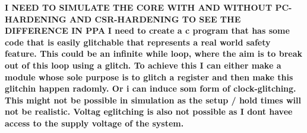 \textbf{I NEED TO SIMULATE THE CORE WITH AND WITHOUT PC-HARDENING AND CSR-HARDENING TO SEE THE DIFFERENCE IN PPA}
\textbf{I need to create a c program that has some code that is easily glitchable that represents a real world safety feature. This could be an infinite while loop, where the aim is to break out of this loop using a glitch. To achieve this I can either make a module whose sole purpose is to glitch a register and then make this glitchin happen radomly. Or i can induce som form of clock-glitching. This might not be possible in simulation as the setup / hold times will not be realistic. Voltag eglitching is also not possible as I dont havee access to the supply voltage of the system.}





